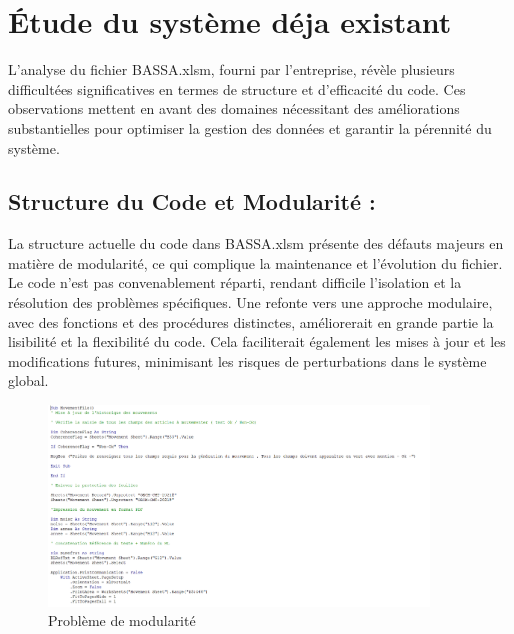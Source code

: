 \documentclass[a4paper, oneside, 12pt, final]{extreport}
\begin{document}
\section{Étude du système déja existant}
L'analyse du fichier BASSA.xlsm, fourni par l'entreprise, révèle plusieurs difficultées significatives en termes de structure et d'efficacité du code. Ces observations mettent en avant des domaines nécessitant des améliorations substantielles pour optimiser la gestion des données et garantir la pérennité du système.

\subsection{Structure du Code et Modularité :}
La structure actuelle du code dans BASSA.xlsm présente des défauts majeurs en matière de modularité, ce qui complique  la maintenance et l'évolution du fichier. Le code n'est pas convenablement réparti, rendant difficile l'isolation et la résolution des problèmes spécifiques. Une refonte vers une approche modulaire, avec des fonctions et des procédures distinctes, améliorerait en grande partie la lisibilité et la flexibilité du code. Cela faciliterait également les mises à jour et les modifications futures, minimisant les risques de perturbations dans le système global.
\begin{figure}[h]
    \centering
    \includegraphics[width=0.9\textwidth]{Capture1.png} %
    \caption{Problème de modularité}
    \label{fig:Problème de modularité}
\end{figure}
\end{document}
